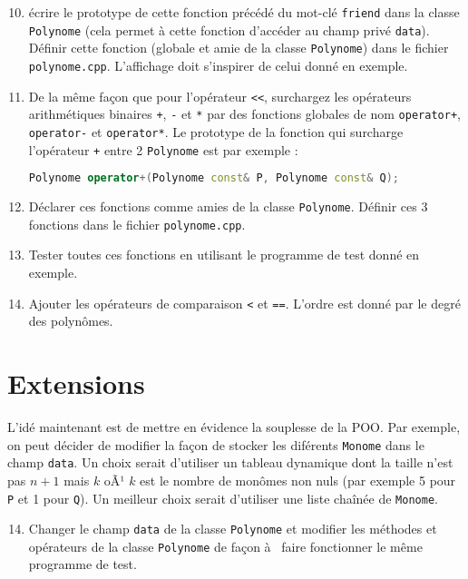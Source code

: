 \documentclass[a4paper,14pt]{article}
\begin{document}
\begin{enumerate}
    \setcounter{enumi}{9}
    \item écrire le prototype de cette fonction précédé du mot-clé \texttt{friend} dans la classe \texttt{Polynome} (cela permet à cette fonction d'accéder au champ privé \texttt{data}). Définir cette fonction (globale et amie de la classe \texttt{Polynome}) dans le fichier \verb|polynome.cpp|. L'affichage doit s'inspirer de celui donné en exemple.
    
    \item De la même façon que pour l'opérateur \texttt{<<}, surchargez les opérateurs arithmétiques binaires \texttt{+}, \texttt{-} et \texttt{*} par des fonctions globales de nom \texttt{operator+}, \texttt{operator-} et \texttt{operator*}. Le prototype de la fonction qui surcharge l'opérateur \texttt{+} entre 2 \texttt{Polynome} est par exemple :
    
    \begin{lstlisting}[language=C++]
    Polynome operator+(Polynome const& P, Polynome const& Q);
    \end{lstlisting}
    
    \item Déclarer ces fonctions comme amies de la classe \texttt{Polynome}. Définir ces 3 fonctions dans le fichier \texttt{polynome.cpp}.
    
    \item Tester toutes ces fonctions en utilisant le programme de test donné en exemple.
    
    \item Ajouter les opérateurs de comparaison \texttt{<} et \texttt{==}. L'ordre est donné par le degré des polynômes.
\end{enumerate}

\section*{Extensions}

L'idé maintenant est de mettre en évidence la souplesse de la POO. Par exemple, on peut décider de modifier la façon de stocker les diférents \texttt{Monome} dans le champ \texttt{data}. Un choix serait d'utiliser un tableau dynamique dont la taille n'est pas $n+1$ mais $k$ oÃ¹ $k$ est le nombre de monômes non nuls (par exemple 5 pour \texttt{P} et 1 pour \texttt{Q}). Un meilleur choix serait d'utiliser une liste chaînée de \texttt{Monome}.

\begin{enumerate}
    \setcounter{enumi}{13}
    \item Changer le champ \texttt{data} de la classe \texttt{Polynome} et modifier les méthodes et opérateurs de la classe \texttt{Polynome} de façon à  faire fonctionner le même programme de test.
\end{enumerate}
\end{document}
